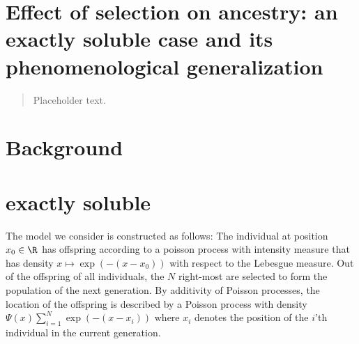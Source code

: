 \section{Effect of selection on ancestry: an exactly soluble case and its phenomenological generalization}\label{dec:}

\begin{quote}
{\small Placeholder text. }
\end{quote}

\section{Background}


\section{exactly soluble}
The model we consider is constructed as follows: The individual at position $x_0 \in \R$ has offspring according to a poisson process with intensity measure that has density $x \mapsto \exp(- (x - x_0))$ with respect to the Lebesgue measure. Out of the offspring of all individuals, the $N$ right-most are selected to form the population of the next generation. By additivity of Poisson processes, the location of the offspring is described by a Poisson process with density $\Psi(x) \sum\limits_{i = 1}^N \exp(-(x - x_i))$ where $x_i$ denotes the position of the $i$'th individual in the current generation. 


